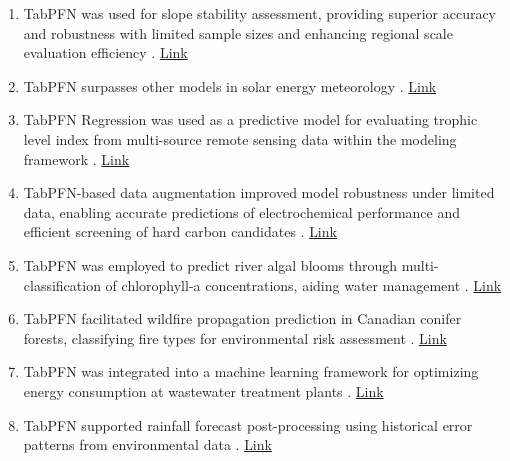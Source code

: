 \begin{enumerate}
\item TabPFN was used for slope stability assessment, providing superior accuracy and robustness with limited sample sizes and enhancing regional scale evaluation efficiency \cite{li2026tabpfnbased}. \href{https://doi.org/10.1016/j.rockmb.2026.100326}{Link}

\item TabPFN surpasses other models in solar energy meteorology \cite{liu2026evaluating}. \href{https://doi.org/10.1016/j.solener.2026.114472}{Link}

\item TabPFN Regression was used as a predictive model for evaluating trophic level index from multi-source remote sensing data within the modeling framework \cite{si2025resolving}. \href{https://doi.org/10.1038/s41545-025-00525-8}{Link}

\item TabPFN-based data augmentation improved model robustness under limited data, enabling accurate predictions of electrochemical performance and efficient screening of hard carbon candidates \cite{chen2025dataaugmentedmachinelearningpredicting}. \href{http://arxiv.org/abs/2510.12833v1}{Link}


\item TabPFN was employed to predict river algal blooms through multi-classification of chlorophyll-a concentrations, aiding water management \cite{energy_usecase1_river_algal_tabpfn}. \href{https://www.earticle.net/Article/A456244}{Link}

\item TabPFN facilitated wildfire propagation prediction in Canadian conifer forests, classifying fire types for environmental risk assessment \cite{energy_usecase2_wildfire_automl}. \href{https://www.sciencedirect.com/science/article/pii/S157495412400253X}{Link}

\item TabPFN was integrated into a machine learning framework for optimizing energy consumption at wastewater treatment plants \cite{energy_usecase3_wwtp_tabpfnreg}. \href{https://www.researchgate.net/publication/390516459_Machine_learning_framework_for_energy_consumption_optimization_using_the_TabPFNRegressor_algorithm}{Link}

\item TabPFN supported rainfall forecast post-processing using historical error patterns from environmental data \cite{energy_usecase4_rainfall_tabpfn}. \href{https://github.com/aarxshi/rainfall_tabpfn}{Link}


\end{enumerate}
